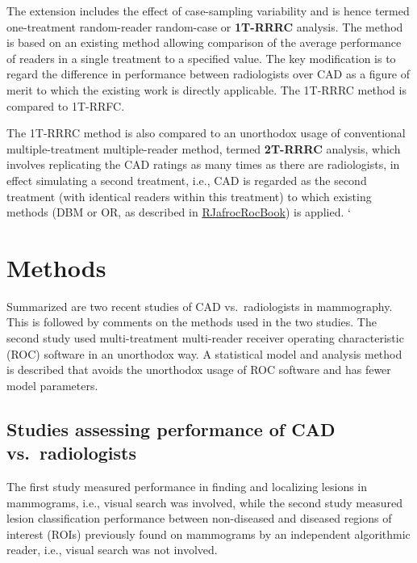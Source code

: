 \documentclass[
]{book}
\begin{document}
The extension includes the effect of case-sampling variability and is hence termed one-treatment random-reader random-case or \textbf{1T-RRRC} analysis. The method is based on an existing method allowing comparison of the average performance of readers in a single treatment to a specified value. The key modification is to regard the difference in performance between radiologists over CAD as a figure of merit to which the existing work is directly applicable. The 1T-RRRC method is compared to 1T-RRFC.

The 1T-RRRC method is also compared to an unorthodox usage of conventional multiple-treatment multiple-reader method, termed \textbf{2T-RRRC} analysis, which involves replicating the CAD ratings as many times as there are radiologists, in effect simulating a second treatment, i.e., CAD is regarded as the second treatment (with identical readers within this treatment) to which existing methods (DBM or OR, as described in \href{https://dpc10ster.github.io/RJafrocRocBook/dbm-analysis-significance-testing.html}{RJafrocRocBook}) is applied.
`

\hypertarget{standalone-cad-radiologists-methods}{%
\section{Methods}\label{standalone-cad-radiologists-methods}}

Summarized are two recent studies of CAD vs.~radiologists in mammography. This is followed by comments on the methods used in the two studies. The second study used multi-treatment multi-reader receiver operating characteristic (ROC) software in an unorthodox way. A statistical model and analysis method is described that avoids the unorthodox usage of ROC software and has fewer model parameters.

\hypertarget{standalone-cad-radiologists-two-previous-studies}{%
\subsection{Studies assessing performance of CAD vs.~radiologists}\label{standalone-cad-radiologists-two-previous-studies}}

The first study \citep{hupse2013standalone} measured performance in finding and localizing lesions in mammograms, i.e., visual search was involved, while the second study \citep{kooi2016comparison} measured lesion classification performance between non-diseased and diseased regions of interest (ROIs) previously found on mammograms by an independent algorithmic reader, i.e., visual search was not involved.
\end{document}
